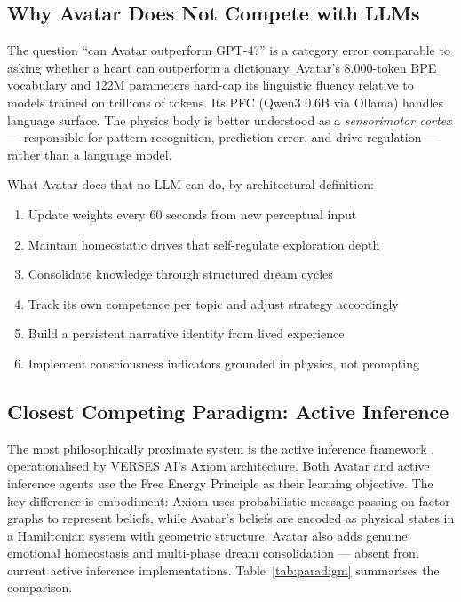 \documentclass[12pt,a4paper]{article}
\begin{document}
\subsection{Why Avatar Does Not Compete with LLMs}

The question ``can Avatar outperform GPT-4?'' is a category error comparable to asking
whether a heart can outperform a dictionary. Avatar's 8{,}000-token BPE vocabulary and
122M parameters hard-cap its linguistic fluency relative to models trained on trillions
of tokens. Its PFC (Qwen3 0.6B via Ollama) handles language surface. The physics body
is better understood as a \emph{sensorimotor cortex} --- responsible for pattern
recognition, prediction error, and drive regulation --- rather than a language model.

What Avatar does that no LLM can do, by architectural definition:
\begin{enumerate}[leftmargin=1.5em, itemsep=2pt]
  \item Update weights every 60 seconds from new perceptual input
  \item Maintain homeostatic drives that self-regulate exploration depth
  \item Consolidate knowledge through structured dream cycles
  \item Track its own competence per topic and adjust strategy accordingly
  \item Build a persistent narrative identity from lived experience
  \item Implement consciousness indicators grounded in physics, not prompting
\end{enumerate}

\subsection{Closest Competing Paradigm: Active Inference}

The most philosophically proximate system is the active inference framework
\cite{parr2022active}, operationalised by VERSES AI's Axiom architecture. Both Avatar
and active inference agents use the Free Energy Principle as their learning objective.
The key difference is embodiment: Axiom uses probabilistic message-passing on factor
graphs to represent beliefs, while Avatar's beliefs are encoded as physical states in a
Hamiltonian system with geometric structure. Avatar also adds genuine emotional
homeostasis and multi-phase dream consolidation --- absent from current active inference
implementations. Table~\ref{tab:paradigm} summarises the comparison.
\end{document}
